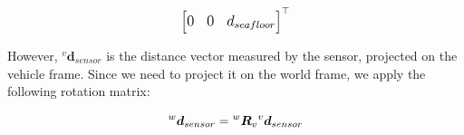 \documentclass{article}
\begin{document}
 \begin{equation}
 \large
 \begin{bmatrix}0 & 0 & d_{seafloor} \end{bmatrix}^\top
 \end{equation}
 
 \skip 0.5cm
 
 However, ${^{v}\boldsymbol{d}_{sensor}}$ is the distance vector measured by the sensor, projected on the vehicle frame. Since we need to project it on the world frame, we apply the following rotation matrix:
 
 \begin{equation}
 \large
     {^{w}\boldsymbol{d}_{sensor}} = {^{w}\boldsymbol{R}_{v}} {^{v}\boldsymbol{d}_{sensor}}
 \end{equation}


\end{document}
